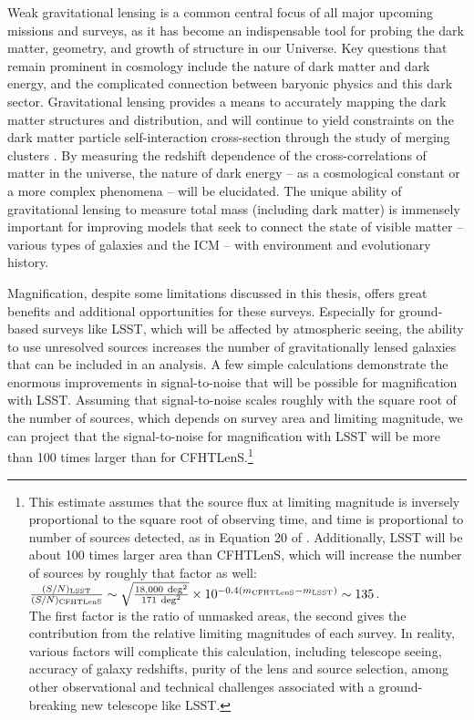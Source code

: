 Weak gravitational lensing is a common central focus of all major upcoming missions and surveys, as it has become an indispensable tool for probing the dark matter, geometry, and growth of structure in our Universe. Key questions that remain prominent in cosmology include the nature of dark matter and dark energy, and the complicated connection between baryonic physics and this dark sector. Gravitational lensing provides a means to accurately mapping the dark matter structures and distribution, and will continue to yield constraints on the dark matter particle self-interaction cross-section through the study of merging clusters \citep{DawsonThesis13,WittmanProposal13}. By measuring the redshift dependence of the cross-correlations of matter in the universe, the nature of dark energy -- as a cosmological constant or a more complex phenomena -- will be elucidated. The unique ability of gravitational lensing to measure total mass (including dark matter) is immensely important for improving models that seek to connect the state of visible matter -- various types of galaxies and the \ac{ICM} -- with environment and evolutionary history.

Magnification, despite some limitations discussed in this thesis, offers great benefits and additional opportunities for these surveys. Especially for ground-based surveys like \ac{LSST}, which will be affected by atmospheric seeing, the ability to use unresolved sources increases the number of gravitationally lensed galaxies that can be included in an analysis. A few simple calculations demonstrate the enormous improvements in signal-to-noise that will be possible for magnification with \ac{LSST}. Assuming that signal-to-noise scales roughly with the square root of the number of sources, which depends on survey area and limiting magnitude, we can project that the signal-to-noise for magnification with \ac{LSST} will be more than 100 times larger than for \ac{CFHTLenS}.\footnote{This estimate assumes that the source flux at limiting magnitude is inversely proportional to the square root of observing time, and time is proportional to number of sources detected, as in Equation 20 of \citet{Chang13}. Additionally, \ac{LSST} will be about 100 times larger area than \ac{CFHTLenS}, which will increase the number of sources by roughly that factor as well: \\ $\frac{(S/N)_{\rm LSST}}{(S/N)_{\rm CFHTLenS}} \sim \sqrt{\frac{18,000\ {\rm deg}^2}{171\ {\rm deg}^2}} \times 10^{-0.4(m_{\rm CFHTLenS} - m_{\rm LSST})} \sim 135$.\\ The first factor is the ratio of unmasked areas, the second gives the contribution from the relative limiting magnitudes of each survey. In reality, various factors will complicate this calculation, including telescope seeing, accuracy of galaxy redshifts, purity of the lens and source selection, among other observational and technical challenges associated with a ground-breaking new telescope like \ac{LSST}.}

